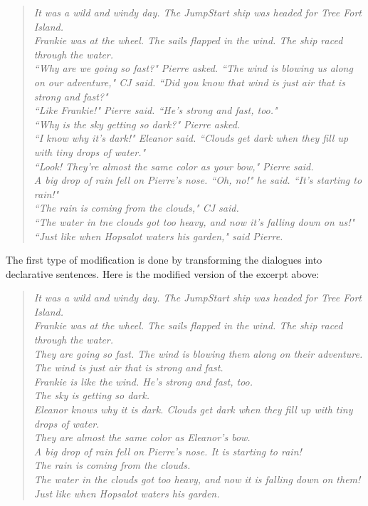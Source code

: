 \begin{verse}
\itshape
It was a wild and windy day. The JumpStart ship was headed for Tree Fort Island. \\
Frankie was at the wheel. The sails flapped in the wind. The ship raced through the water. \\
``Why are we going so fast?" Pierre asked. ``The wind is blowing us along on our adventure," CJ said. ``Did you know that wind is just air that is strong and fast?" \\
``Like Frankie!" Pierre said. ``He's strong and fast, too." \\
``Why is the sky getting so dark?" Pierre asked. \\
``I know why it's dark!" Eleanor said. ``Clouds get dark when they fill up with tiny drops of water." \\
``Look! They're almost the same color as your bow," Pierre said. \\
A big drop of rain fell on Pierre's nose. ``Oh, no!" he said. ``It's starting to rain!" \\
``The rain is coming from the clouds," CJ said. \\
``The water in tne clouds got too heavy, and now it's falling down on us!" \\
``Just like when Hopsalot waters his garden," said Pierre. \\
\end{verse}

The first type of modification is done by transforming the dialogues into declarative sentences. Here is the modified version of the excerpt above:

\begin{verse}
\itshape
It was a wild and windy day. The JumpStart ship was headed for Tree Fort Island. \\
Frankie was at the wheel. The sails flapped in the wind. The ship raced through the water. \\
They are going so fast. The wind is blowing them along on their adventure. The wind is just air that is strong and fast. \\
Frankie is like the wind. He's strong and fast, too. \\
The sky is getting so dark.\\
Eleanor knows why it is dark. Clouds get dark when they fill up with tiny drops of water. \\
They are almost the same color as Eleanor's bow. \\
A big drop of rain fell on Pierre's nose. It is starting to rain! \\
The rain is coming from the clouds. \\
The water in the clouds got too heavy, and now it is falling down on them! \\
Just like when Hopsalot waters his garden. \\
\end{verse}


